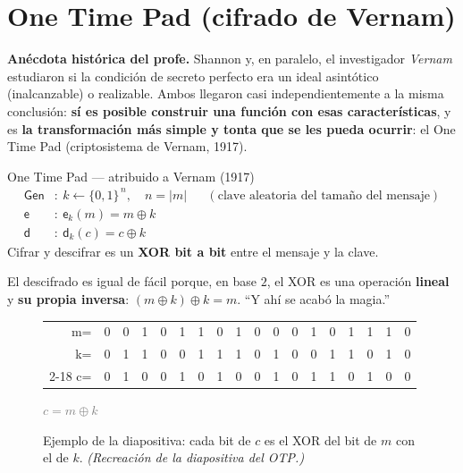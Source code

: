 \documentclass[11pt,a4paper]{article}
\newcommand{\xor}{\oplus}
\newcommand{\Gen}{\mathsf{Gen}}
\newcommand{\E}{\mathsf{e}}
\newcommand{\D}{\mathsf{d}}
\newcommand{\bits}{\{0,1\}}
\begin{document}
\section{One Time Pad (cifrado de Vernam)}

\begin{slidebox}
\textbf{Anécdota histórica del profe.} Shannon y, en paralelo, el investigador
\emph{Vernam} estudiaron si la condición de secreto perfecto era un ideal asintótico
(inalcanzable) o realizable. Ambos llegaron casi independientemente a la misma
conclusión: \textbf{sí es posible construir una función con esas características}, y es
\textbf{la transformación más simple y tonta que se les pueda ocurrir}: el One Time Pad
(criptosistema de Vernam, 1917).
\end{slidebox}

\begin{defbox}{One Time Pad — atribuido a Vernam (1917)}
\[
\begin{aligned}
  \Gen &:\ k \leftarrow \bits^{\,n},\quad n=|m| && (\text{clave aleatoria del tamaño del mensaje})\\
  \E &:\ \E_k(m) = m \xor k\\
  \D &:\ \D_k(c) = c \xor k
\end{aligned}
\]
Cifrar y descifrar es un \textbf{XOR bit a bit} entre el mensaje y la clave.
\end{defbox}

El descifrado es igual de fácil porque, en base $2$, el XOR es una operación
\textbf{lineal} y \textbf{su propia inversa}: $(m\xor k)\xor k = m$. ``Y ahí se acabó la
magia.''

\begin{figure}[h]
\centering
\setlength{\tabcolsep}{3pt}\ttfamily\footnotesize
\begin{tabular}{r *{17}{c}}
\rmfamily m= & 0&0&1&0&1&1&0&1&0&0&0&1&0&1&1&1&0\\
\rmfamily k= & 0&1&1&0&0&1&1&1&0&1&0&0&1&1&0&1&0\\
\cmidrule(lr){2-18}
\rmfamily c= & 0&1&0&0&1&0&1&0&0&1&0&1&1&0&1&0&0\\
\end{tabular}
\quad\rmfamily\scriptsize\textcolor{gray}{$c = m\xor k$}
\caption{Ejemplo de la diapositiva: cada bit de $c$ es el XOR del bit de $m$ con el de
$k$. \textit{(Recreación de la diapositiva del OTP.)}}
\end{figure}
\end{document}
